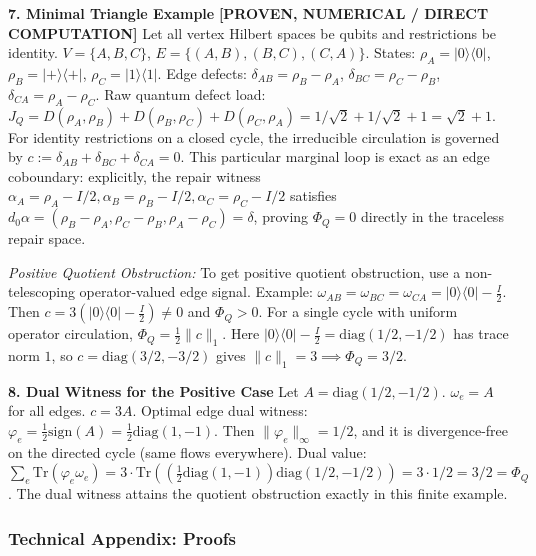 \documentclass[
  11pt,
]{article}
\begin{document}
\textbf{7. Minimal Triangle Example} \textbf{{[}PROVEN, NUMERICAL / DIRECT COMPUTATION{]}}
Let all vertex Hilbert spaces be qubits and restrictions be identity. \(V=\{A,B,C\}\), \(E=\{(A,B),(B,C),(C,A)\}\).
States: \(\rho_A = |0\rangle\langle0|\), \(\rho_B = |+\rangle\langle+|\), \(\rho_C = |1\rangle\langle1|\).
Edge defects: \(\delta_{AB} = \rho_B-\rho_A\), \(\delta_{BC} = \rho_C-\rho_B\), \(\delta_{CA} = \rho_A-\rho_C\).
Raw quantum defect load: \(J_Q = D(\rho_A,\rho_B)+D(\rho_B,\rho_C)+D(\rho_C,\rho_A) = 1/\sqrt{2} + 1/\sqrt{2} + 1 = \sqrt{2} + 1\).
For identity restrictions on a closed cycle, the irreducible circulation is governed by \(c := \delta_{AB} + \delta_{BC} + \delta_{CA} = 0\). This particular marginal loop is exact as an edge coboundary: explicitly, the repair witness \(\alpha_A = \rho_A - I/2, \alpha_B = \rho_B - I/2, \alpha_C = \rho_C - I/2\) satisfies \(d_0\alpha = (\rho_B-\rho_A, \rho_C-\rho_B, \rho_A-\rho_C) = \delta\), proving \(\Phi_Q = 0\) directly in the traceless repair space.

\emph{Positive Quotient Obstruction:} To get positive quotient obstruction, use a non-telescoping operator-valued edge signal.
Example: \(\omega_{AB} = \omega_{BC} = \omega_{CA} = |0\rangle\langle0| - \frac{I}{2}\).
Then \(c = 3(|0\rangle\langle0| - \frac{I}{2}) \ne 0\) and \(\Phi_Q > 0\).
For a single cycle with uniform operator circulation, \(\Phi_Q = \frac{1}{2}\|c\|_1\).
Here \(|0\rangle\langle0| - \frac{I}{2} = \text{diag}(1/2, -1/2)\) has trace norm \(1\), so \(c = \text{diag}(3/2, -3/2)\) gives \(\|c\|_1=3 \implies \Phi_Q = 3/2\).

\textbf{8. Dual Witness for the Positive Case}
Let \(A = \text{diag}(1/2, -1/2)\). \(\omega_e = A\) for all edges. \(c = 3A\).
Optimal edge dual witness: \(\varphi_e = \frac{1}{2}\text{sign}(A) = \frac{1}{2}\text{diag}(1, -1)\).
Then \(\|\varphi_e\|_\infty = 1/2\), and it is divergence-free on the directed cycle (same flows everywhere).
Dual value: \(\sum_e \text{Tr}(\varphi_e \omega_e) = 3 \cdot \text{Tr}( (\frac{1}{2}\text{diag}(1,-1))\text{diag}(1/2,-1/2) ) = 3 \cdot 1/2 = 3/2 = \Phi_Q\).
The dual witness attains the quotient obstruction exactly in this finite example.

\subsubsection{Technical Appendix: Proofs}\label{technical-appendix-proofs}
\end{document}
